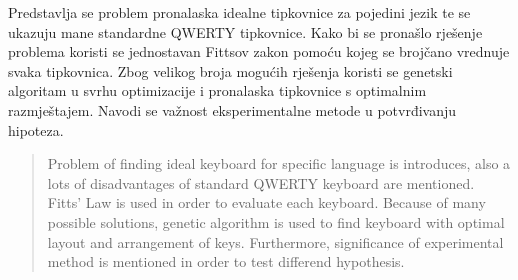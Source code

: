 \documentclass[times, utf8, zavrsni, numeric]{fer}
\begin{document}
\clearpage

\begin{sazetak}
Predstavlja se problem pronalaska idealne tipkovnice za pojedini jezik te se ukazuju mane standardne QWERTY tipkovnice. Kako bi se pronašlo rješenje problema koristi se jednostavan Fittsov zakon pomoću kojeg se brojčano vrednuje svaka tipkovnica. Zbog velikog broja mogućih rješenja koristi se genetski algoritam u svrhu optimizacije i pronalaska tipkovnice s optimalnim razmještajem. Navodi se važnost eksperimentalne metode u potvrđivanju hipoteza.

\end{sazetak}

\begin{abstract}
Problem of finding ideal keyboard for specific language is introduces, also a lots of disadvantages of standard QWERTY keyboard are mentioned. Fitts' Law is used in order to evaluate each keyboard. Because of many possible solutions, genetic algorithm is used to find keyboard with optimal layout and arrangement of keys. Furthermore, significance of experimental method is mentioned in order to test differend hypothesis.

\end{abstract}
\end{document}
